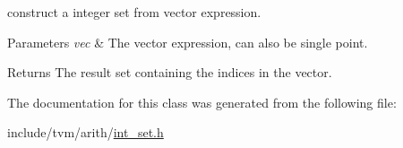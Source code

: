 construct a integer set from vector expression. 


\begin{DoxyParams}{Parameters}
{\em vec} & The vector expression, can also be single point. \\
\hline
\end{DoxyParams}
\begin{DoxyReturn}{Returns}
The result set containing the indices in the vector. 
\end{DoxyReturn}


The documentation for this class was generated from the following file\+:\begin{DoxyCompactItemize}
\item 
include/tvm/arith/\hyperlink{int__set_8h}{int\+\_\+set.\+h}\end{DoxyCompactItemize}
